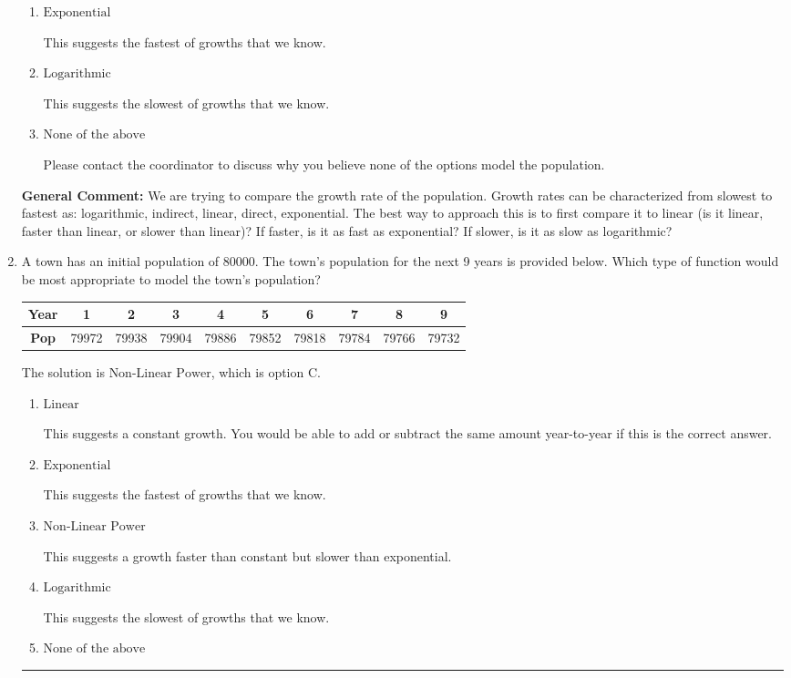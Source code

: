 \documentclass{extbook}[14pt]
\newcommand{\litem}[1]{\item #1

\rule{\textwidth}{0.4pt}}
\begin{document}
\begin{enumerate}
{\begin{enumerate}[label=\Alph*.]
This suggests a growth faster than constant but slower than exponential.
\item \( \text{Exponential} \)

This suggests the fastest of growths that we know.
\item \( \text{Logarithmic} \)

This suggests the slowest of growths that we know.
\item \( \text{None of the above} \)

Please contact the coordinator to discuss why you believe none of the options model the population.
\end{enumerate}

\textbf{General Comment:} We are trying to compare the growth rate of the population. Growth rates can be characterized from slowest to fastest as: logarithmic, indirect, linear, direct, exponential. The best way to approach this is to first compare it to linear (is it linear, faster than linear, or slower than linear)? If faster, is it as fast as exponential? If slower, is it as slow as logarithmic?
}
\litem{
A town has an initial population of 80000. The town's population for the next 9 years is provided below. Which type of function would be most appropriate to model the town's population?


\begin{tabular}{c|c|c|c|c|c|c|c|c|c}
\textbf{Year} &1 &2 &3 &4 &5 &6 &7 &8 &9\tabularnewline \hline
\textbf{Pop} &79972 &79938 &79904 &79886 &79852 &79818 &79784 &79766 &79732\end{tabular}The solution is \( \text{Non-Linear Power} \), which is option C.\begin{enumerate}[label=\Alph*.]
\item \( \text{Linear} \)

This suggests a constant growth. You would be able to add or subtract the same amount year-to-year if this is the correct answer.
\item \( \text{Exponential} \)

This suggests the fastest of growths that we know.
\item \( \text{Non-Linear Power} \)

This suggests a growth faster than constant but slower than exponential.
\item \( \text{Logarithmic} \)

This suggests the slowest of growths that we know.
\item \( \text{None of the above} \)


\end{enumerate}}
\end{enumerate}
\end{document}

